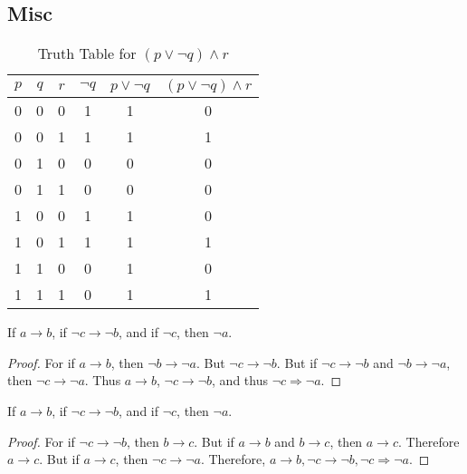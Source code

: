     \subsection{Misc}
        \begin{table}[H]
            \centering
            \captionsetup{type=table}
            \begin{tabular}{c c c c c c}
                \hline
                $p$&$q$&$r$&$\neg{q}$&$p\lor\neg{q}$&$(p\lor\neg{q})\land{r}$\\
                \hline
                0&0&0&1&1&0\\
                0&0&1&1&1&1\\
                0&1&0&0&0&0\\
                0&1&1&0&0&0\\
                1&0&0&1&1&0\\
                1&0&1&1&1&1\\
                1&1&0&0&1&0\\
                1&1&1&0&1&1\\
                \hline
            \end{tabular}
            \caption{Truth Table for $(p\lor\neg{q})\land{r}$}
            \label{tab:Truth_Table_Example}
        \end{table}
        \begin{theorem}
            If $a\rightarrow{b}$, if $\neg{c}\rightarrow\neg{b}$, and if
            $\neg{c}$, then $\neg{a}$.
        \end{theorem}
        \begin{proof}
            For if $a\rightarrow{b}$, then $\neg{b}\rightarrow\neg{a}$. But
            $\neg{c}\rightarrow\neg{b}$. But if $\neg{c}\rightarrow\neg{b}$ and
            $\neg{b}\rightarrow\neg{a}$, then $\neg{c}\rightarrow\neg{a}$. Thus
            $a\rightarrow{b}$, $\neg{c}\rightarrow\neg{b}$, and thus
            $\neg{c}\Rightarrow\neg{a}$.
        \end{proof}
        \begin{problem}
            If $a\rightarrow{b}$, if $\neg{c}\rightarrow\neg{b}$, and if
            $\neg{c}$, then $\neg{a}$.
        \end{problem}
        \begin{proof}
            For if $\neg c \rightarrow \neg b$, then $b\rightarrow c$. But if
            $a\rightarrow b$ and $b\rightarrow c$, then $a\rightarrow c$.
            Therefore $a\rightarrow c$. But if $a\rightarrow c$, then
            $\neg c \rightarrow \neg a$. Therefore,
            $a\rightarrow b,\neg c\rightarrow\neg b,\neg c\Rightarrow\neg a$.
        \end{proof}